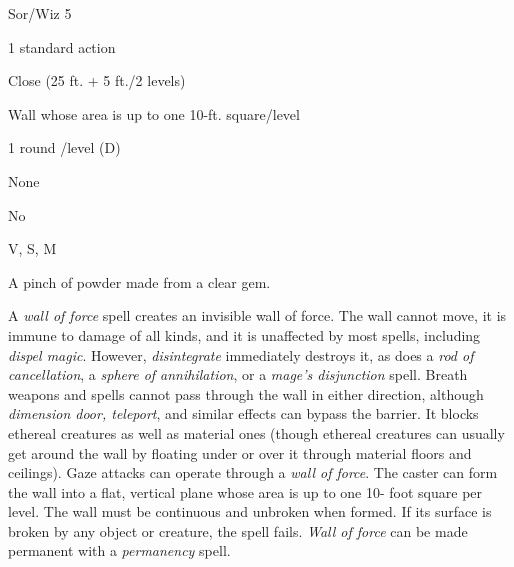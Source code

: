 
\begin{description*}
\item[Level:] Sor/Wiz 5
\item[Casting Time:] 1 standard action
\item[Range:] Close (25 ft. + 5 ft./2 levels)
\item[Effect:] Wall whose area is up to one 10-ft. square/level
\item[Duration:] 1 round /level (D)
\item[Saving Throw:] None
\item[Spell Resistance:] No
\item[Components:] V, S, M
\item[Arcane Material Component:] A pinch of powder made from a clear gem.
\end{description*}

A \textit{wall of force} spell creates an invisible wall of force. The wall cannot
move, it is immune to damage of all kinds, and it is unaffected by most spells,
including \textit{dispel magic}. However, \textit{disintegrate} immediately destroys
it, as does a \textit{rod of cancellation}, a \textit{sphere of annihilation}, or
a \textit{mage's disjunction} spell. Breath weapons and spells cannot pass through
the wall in either direction, although \textit{dimension door, teleport}, and similar
effects can bypass the barrier. It blocks ethereal creatures as well as material
ones (though ethereal creatures can usually get around the wall by floating under
or over it through material floors and ceilings). Gaze attacks can operate through
a \textit{wall of force}.
The caster can form the wall into a flat, vertical plane whose area is up to one
10- foot square per level. The wall must be continuous and unbroken when formed.
If its surface is broken by any object or creature, the spell fails.
\textit{Wall of force} can be made permanent with a \textit{permanency} spell.